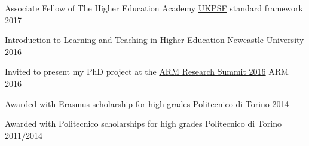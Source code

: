
\begin{cvhonors}


\cvhonor
{Associate Fellow of The Higher Education Academy} %
{{\color{myblue}\href{https://www.heacademy.ac.uk/ukpsf}{UKPSF}} standard 
framework} %
{} %
{2017} %

\cvhonor
{Introduction to Learning and Teaching in Higher Education}
{Newcastle University}
{}
{2016}

\cvhonor
{Invited to present my PhD project at the 
{\color{myblue}\href{https://developer.arm.com/research/summit/previous-summits/2016/speakers}{ARM
 Research Summit 2016}}}
{ARM}
{}
{2016}

\cvhonor
{Awarded with Erasmus scholarship for high grades}
{Politecnico di Torino}
{}
{2014}

\cvhonor
{Awarded with Politecnico scholarships for high grades}
{Politecnico di Torino}
{}
{2011/2014}


\end{cvhonors}